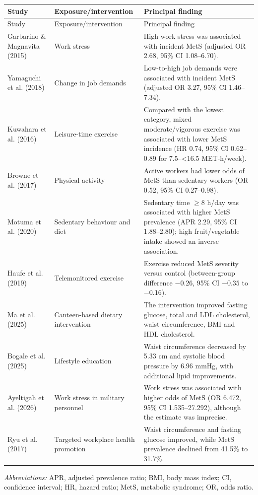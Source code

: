 \begin{longtable}{p{} p{} p{}}
\toprule
Study & Exposure/intervention & Principal finding \\
\midrule
\endfirsthead
\toprule
Study & Exposure/intervention & Principal finding \\
\midrule
\endhead
Garbarino \& Magnavita (2015) & Work stress & High work stress was associated with incident MetS (adjusted OR 2.68, 95\% CI 1.08--6.70). \\
Yamaguchi et al. (2018) & Change in job demands & Low-to-high job demands were associated with incident MetS (adjusted OR 3.27, 95\% CI 1.46--7.34). \\
Kuwahara et al. (2016) & Leisure-time exercise & Compared with the lowest category, mixed moderate/vigorous exercise was associated with lower MetS incidence (HR 0.74, 95\% CI 0.62--0.89 for 7.5--<16.5 MET-h/week). \\
Browne et al. (2017) & Physical activity & Active workers had lower odds of MetS than sedentary workers (OR 0.52, 95\% CI 0.27--0.98). \\
Motuma et al. (2020) & Sedentary behaviour and diet & Sedentary time $\geq$8 h/day was associated with higher MetS prevalence (APR 2.29, 95\% CI 1.88--2.80); high fruit/vegetable intake showed an inverse association. \\
Haufe et al. (2019) & Telemonitored exercise & Exercise reduced MetS severity versus control (between-group difference $-0.26$, 95\% CI $-0.35$ to $-0.16$). \\
Ma et al. (2025) & Canteen-based dietary intervention & The intervention improved fasting glucose, total and LDL cholesterol, waist circumference, BMI and HDL cholesterol. \\
Bogale et al. (2025) & Lifestyle education & Waist circumference decreased by 5.33 cm and systolic blood pressure by 6.96 mmHg, with additional lipid improvements. \\
Ayeltigah et al. (2026) & Work stress in military personnel & Work stress was associated with higher odds of MetS (OR 6.472, 95\% CI 1.535--27.292), although the estimate was imprecise. \\
Ryu et al. (2017) & Targeted workplace health promotion & Waist circumference and fasting glucose improved, while MetS prevalence declined from 41.5\% to 31.7\%. \\
\bottomrule
\end{longtable}

\vspace{0.5em}
\noindent\textit{Abbreviations:} APR, adjusted prevalence ratio; BMI, body mass index; CI, confidence interval; HR, hazard ratio; MetS, metabolic syndrome; OR, odds ratio.

